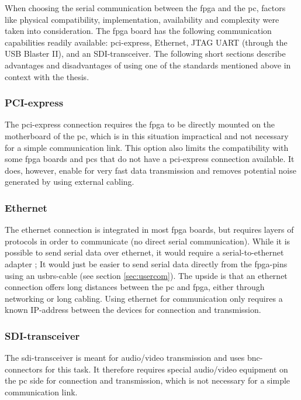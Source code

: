 \documentclass[main.tex]{subfiles}
\begin{document}
When choosing the serial communication between the \gls{fpga} and the \acrshort{pc}, factors like physical compatibility, implementation, availability and complexity were taken into consideration. The \gls{fpga} board has the following communication capabilities readily available: \gls{pci}-express, Ethernet, JTAG UART (through the USB Blaster II), and an SDI-transceiver. The following short sections describe advantages and disadvantages of using one of the standards mentioned above in context with the thesis.

\subsubsection{PCI-express}
The \gls{pci}-express connection requires the \gls{fpga} to be directly mounted on the motherboard of the \acrshort{pc}, which is in this situation impractical and not necessary for a simple communication link. This option also limits the compatibility with some \gls{fpga} boards and \acrshort{pc}s that do not have a \gls{pci}-express connection available. It does, however, enable for very fast data transmission and removes potential noise generated by using external cabling. 

\subsubsection{Ethernet}
The ethernet connection is integrated in most \gls{fpga} boards, but requires layers of protocols in order to communicate (no direct serial communication). While it is possible to send serial data over ethernet, it would require a serial-to-ethernet adapter \cite{serial2ethernet}; It would just be easier to send serial data directly from the \gls{fpga}-pins using an \gls{usbrs}-cable (see section \ref{sec:usercom}). The upside is that an ethernet connection offers long distances between the \acrshort{pc} and \gls{fpga}, either through networking or long cabling. Using ethernet for communication only requires a known IP-address between the devices for connection and transmission.

\subsubsection{SDI-transceiver}
The \acrshort{sdi}-transceiver is meant for audio/video transmission and uses \acrshort{bnc}-connectors for this task. It therefore requires special audio/video equipment on the \acrshort{pc} side for connection and transmission, which is not necessary for a simple communication link.
\end{document}
